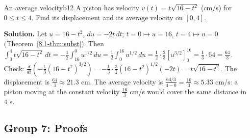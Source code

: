 \documentclass[11pt]{article}
\begin{document}
\begin{exmp}{An average velocity}{b12}
A piston has velocity $v(t)=t\sqrt{16-t^2}$ (cm/s) for $0\le t\le4$. Find its displacement and its average velocity on $[0,4]$.

\textbf{Solution.} Let $u=16-t^2$, $du=-2t\,dt$; $t=0\mapsto u=16$, $t=4\mapsto u=0$ (Theorem~\ref{8.1-thm:subst}). Then $\int_0^4t\sqrt{16-t^2}\,dt=-\frac12\int_{16}^0u^{1/2}\,du=\frac12\int_0^{16}u^{1/2}\,du=\frac12\cdot\frac23\left[u^{3/2}\right]_0^{16}=\frac13\cdot64=\frac{64}3$. Check: $\frac d{dt}\left(-\frac13(16-t^2)^{3/2}\right)=-\frac13\cdot\frac32(16-t^2)^{1/2}(-2t)=t\sqrt{16-t^2}$.
The displacement is $\frac{64}3\approx21.3$ cm. The average velocity is $\frac{64/3}{4-0}=\frac{16}3\approx5.33$ cm/s: a piston moving at the constant velocity $\frac{16}3$ cm/s would cover the same distance in $4$ s.
\end{exmp}

\subsection*{Group 7: Proofs}
\end{document}
